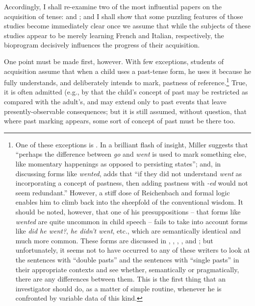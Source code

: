 Accordingly, I shall re-examine two of the most influential papers on the acquisition of tense: \citet{BrockartEtAl1973} and \citet{AntinucciEtAl1976}; and I shall show that some puzzling features of those studies become immediately clear once we assume that while the subjects of these studies appear to be merely learning French and Italian, respectively, the bioprogram decisively influences the progress of their acquisition.

One point must be made first, however. With few exceptions, students of acquisition assume that when a child uses a past-tense form, he uses it because he fully understands, and deliberately intends to mark, pastness of reference.\footnote{One of these exceptions is \citet{Miller1978}. In a brilliant flash of insight, Miller suggests that ``perhaps the difference between \textit{go} and \textit{went} is used to mark something else, like momentary happenings as opposed to persisting states''; and, in discussing forms like \textit{wented}, adds that ``if they did not understand \textit{went} as incorporating a concept of pastness, then adding pastness with \textit{-ed} would not seem redundant.'' However, a stiff dose of Reichenbach and formal logic enables him to climb back into the sheepfold of the conventional wisdom. It should be noted, however, that one of his presuppositions -- that forms like \textit{wented} are quite uncommon in child speech -- fails to take into account forms like \textit{did he went?}, \textit{he didn't went}, etc., which are semantically identical and much more common. These forms are discussed in \citet{Hurford1975}, \citet{Kuczaj1976}, \citet{Fay1978}, \citet{MaratsosEtAl1978}, and \citet{ErreichEtAl1980}; but unfortunately, it seems not to have occurred to any of these writers to look at the sentences with ``double pasts'' and the sentences with ``single pasts'' in their appropriate contexts and see whether, semantically or pragmatically, there are any differences between them. This is the first thing that an investigator should do, as a matter of simple routine, whenever he is confronted by variable data of this kind.\label{Fn5}} True, it is often admitted (e.g., by \citet{AntinucciEtAl1976} that the child's concept of past may be restricted as compared with the adult's, and may extend only to past events that leave presently-observable consequences; but it is still assumed, without question, that where past marking appears, some sort of concept of past must be there too.

